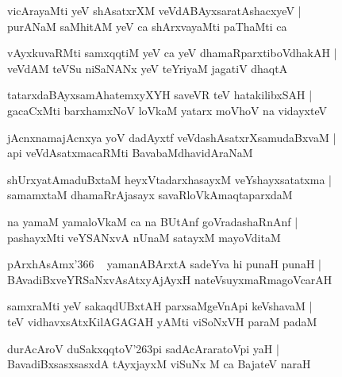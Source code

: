 \documentclass[twoside,12pt,openright]{book}
\def\S{\char'263}
\newcounter{shloka}[chapter]
\begin{document}
\begin{shloka}
vicArayaMti yeV shAsatxrXM veVdABAyxsaratAshacxyeV |\\
purANaM saMhitAM yeV ca shArxvayaMti paThaMti ca 
\end{shloka}

\begin{shloka}
vAyxkuvaRMti samxqqtiM yeV ca yeV dhamaRparxtiboVdhakAH |\\
veVdAM teVSu niSaNANx yeV teYriyaM jagatiV dhaqtA 
\end{shloka}

\begin{shloka}
tatarxdaBAyxsamAhatemxyXYH saveVR teV hatakilibxSAH |\\
gacaCxMti barxhamxNoV loVkaM yatarx moVhoV na vidayxteV 
\end{shloka}

\begin{shloka}
jAcnxnamajAcnxya yoV dadAyxtf veVdashAsatxrXsamudaBxvaM |\\
api veVdAsatxmacaRMti BavabaMdhavidAraNaM 
\end{shloka}

\begin{shloka}
shUrxyatAmaduBxtaM heyxVtadarxhasayxM veYshayxsatatxma |\\
samamxtaM dhamaRrAjasayx savaRloVkAmaqtaparxdaM 
\end{shloka}

\begin{shloka}
na yamaM yamaloVkaM  ca na BUtAnf goVradashaRnAnf |\\
pashayxMti veYSANxvA nUnaM satayxM mayoVditaM 
\end{shloka}

\begin{shloka}
pArxhAsAmx\char'366 ~ yamanABArxtA sadeYva hi punaH punaH |\\
BAvadiBxveYRSaNxvAsAtxyAjAyxH nateVsuyxmaRmagoVcarAH 
\end{shloka}

\begin{shloka}
samxraMti yeV sakaqdUBxtAH parxsaMgeVnApi keVshavaM |\\
teV vidhavxsAtxKilAGAGAH yAMti viSoNxVH paraM padaM 
\end{shloka}

\begin{shloka}
durAcAroV duSakxqqtoV\S pi sadAcAraratoVpi yaH |\\
BavadiBxsasxsasxdA tAyxjayxM viSuNx M ca BajateV naraH 
\end{shloka}
\end{document}
